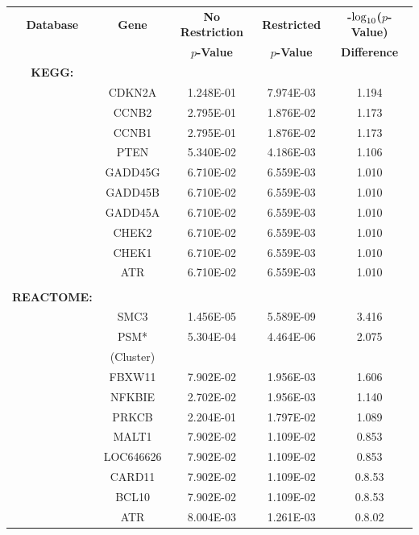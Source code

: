 \documentclass[12pt,a4paper]{article}
\def\log{{\rm log}}
\begin{document}
\setlength{\footskip}{2cm}
\begin{table}[ht]
\centering
\begin{tabular}{ccccc}
  \hline
  \textbf{Database} & \textbf{Gene} & \textbf{No Restriction} & \textbf{Restricted} & \textbf{-$\log_{10}$($p$-Value)} \\
  & & \textbf{$p$-Value} & \textbf{$p$-Value} & \textbf{Difference} \\
  \hline
  \textbf{KEGG:} & & & & \\
  & CDKN2A & 1.248E-01 & 7.974E-03 & 1.194 \\
  & CCNB2 & 2.795E-01 & 1.876E-02 & 1.173 \\
  & CCNB1 & 2.795E-01 & 1.876E-02 & 1.173 \\
  & PTEN & 5.340E-02 & 4.186E-03 & 1.106 \\
  & GADD45G & 6.710E-02 & 6.559E-03 & 1.010 \\
  & GADD45B & 6.710E-02 & 6.559E-03 & 1.010 \\
  & GADD45A & 6.710E-02 & 6.559E-03 & 1.010 \\
  & CHEK2 & 6.710E-02 & 6.559E-03 & 1.010 \\
  & CHEK1 & 6.710E-02 & 6.559E-03 & 1.010 \\
  & ATR & 6.710E-02 & 6.559E-03 & 1.010 \\
  \\
  \textbf{REACTOME:} & & & & \\ 
  & SMC3 & 1.456E-05 & 5.589E-09 & 3.416 \\
  & PSM* & 5.304E-04 & 4.464E-06 & 2.075 \\
  & (Cluster) & & & \\ 
  & FBXW11 & 7.902E-02 & 1.956E-03 & 1.606 \\
  & NFKBIE & 2.702E-02 & 1.956E-03 & 1.140 \\
  & PRKCB & 2.204E-01 & 1.797E-02 & 1.089 \\
  & MALT1 & 7.902E-02 & 1.109E-02 & 0.853 \\
  & LOC646626 & 7.902E-02 & 1.109E-02 & 0.853 \\
  & CARD11 & 7.902E-02 & 1.109E-02 & 0.8.53 \\
  & BCL10 & 7.902E-02 & 1.109E-02 & 0.8.53 \\
  & ATR & 8.004E-03 & 1.261E-03 & 0.8.02 \\
   \hline
\end{tabular}

\end{table}
\end{document}
